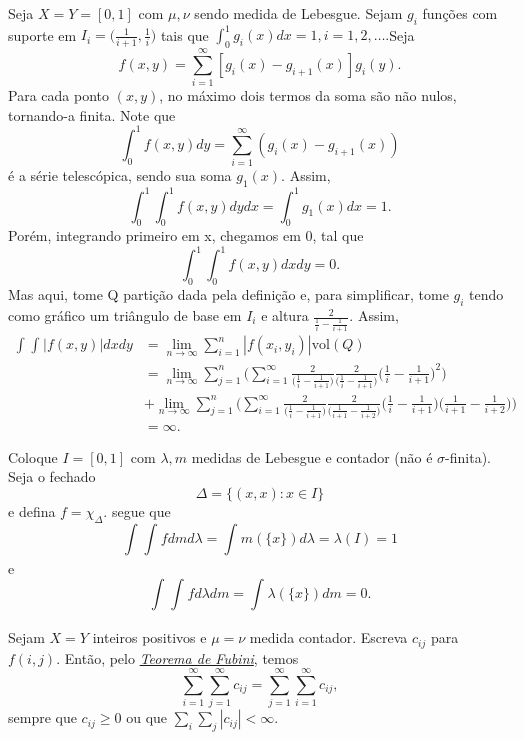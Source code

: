 \documentclass[measure_theory.tex]{subfiles}
\begin{document}
\begin{example}
	Seja \(X = Y = [0, 1]\) com \(\mu, \nu\) sendo medida de Lebesgue. Sejam \(g_{i}\) funções com suporte em \(I_{i} = \biggl(\frac{1}{i+1}, \frac{1}{i}\biggr)\) tais que \(\int_{0}^{1}g_{i}(x)dx = 1, i = 1, 2, \dotsc .\)Seja
	\[
		f(x, y) = \sum\limits_{i=1}^{\infty}[g_{i}(x)-g_{i+1}(x)]g_{i}(y).
	\]
	Para cada ponto \((x, y)\), no máximo dois termos da soma são não nulos, tornando-a finita. Note que
	\[
		\int_{0}^{1}f(x, y)dy = \sum\limits_{i=1}^{\infty}(g_{i}(x)-g_{i+1}(x))
	\]
	é a série telescópica, sendo sua soma \(g_1(x).\) Assim,
	\[
		\int_{0}^{1}\int_{0}^{1}f(x, y)dydx = \int_{0}^{1}g_1(x)dx = 1.
	\]
	Porém, integrando primeiro em x, chegamos em 0, tal que
	\[
		\int_{0}^{1}\int_{0}^{1}f(x, y)dxdy = 0.
	\]
	Mas aqui, tome Q partição dada pela definição e, para simplificar, tome \(g_{i}\) tendo como gráfico um triângulo de base em \(I_{i}\) e altura \(\frac{2}{\frac{1}{i}-\frac{1}{i+1}}.\) Assim,
	\begin{align*}
		\int_{}^{}\int_{}^{}|f(x, y)|dxdy & = \lim_{n\to \infty}\sum\limits_{i=1}^{n}|f(x_{i}, y_{i})|\mathrm{vol}(Q)                                                                                                                                                                                             \\
		                                  & = \lim_{n\to \infty}\sum\limits_{j=1}^{n}\biggl(\sum\limits_{i=1}^{\infty}\frac{2}{\biggl(\frac{1}{i}-\frac{1}{i+1}\biggr)}\frac{2}{\biggl(\frac{1}{i}-\frac{1}{i+1}\biggr)}\biggl(\frac{1}{i}-\frac{1}{i+1}\biggr)^{2}\biggr)                                        \\
		                                  & + \lim_{n\to \infty}\sum\limits_{j=1}^{n}\biggl(\sum\limits_{i=1}^{\infty}\frac{2}{\biggl(\frac{1}{i}-\frac{1}{i+1}\biggr)}\frac{2}{\biggl(\frac{1}{i+1}-\frac{1}{i+2}\biggr)}\biggl(\frac{1}{i}-\frac{1}{i+1}\biggr)\biggl(\frac{1}{i+1}-\frac{1}{i+2}\biggr)\biggr) \\
		                                  & = \infty.
	\end{align*}
\end{example}
\begin{example}
	Coloque \(I=[0, 1]\) com \(\lambda , m\) medidas de Lebesgue e contador (não é \(\sigma \)-finita). Seja o fechado
	\[
		\Delta = \{(x, x): x\in I\}
	\]
	e defina \(f=\chi_{\Delta }.\) segue que
	\[
		\int_{}^{}\int_{}^{}fdmd\lambda = \int_{}^{}m(\{x\})d\lambda = \lambda (I) = 1
	\]
	e
	\[
		\int_{}^{}\int_{}^{}fd\lambda dm = \int_{}^{}\lambda (\{x\})dm = 0.
	\]
\end{example}
Sejam \(X = Y\) inteiros positivos e \(\mu  = \nu\) medida contador. Escreva \(c_{ij}\) para \(f(i, j).\) Então, pelo \hyperlink{fubini_tonelli}{\textit{Teorema de Fubini}}, temos
\[
	\sum\limits_{i=1}^{\infty}\sum\limits_{j=1}^{\infty}c_{ij} = \sum\limits_{j=1}^{\infty}\sum\limits_{i=1}^{\infty}c_{ij},
\]
sempre que \(c_{ij}\geq 0\) ou que \(\sum\limits_{i}^{}\sum\limits_{j}^{}|c_{ij}| < \infty\).
\end{document}
